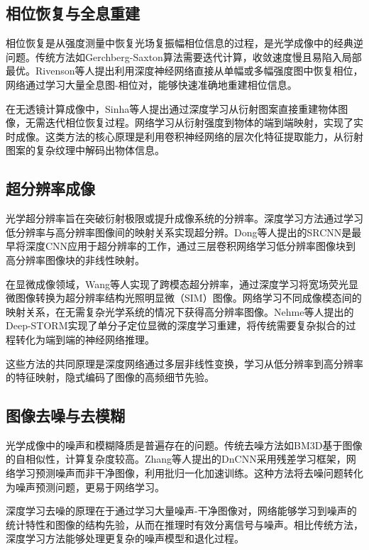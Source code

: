 {\subsection{相位恢复与全息重建}

相位恢复是从强度测量中恢复光场复振幅相位信息的过程，是光学成像中的经典逆问题。传统方法如Gerchberg-Saxton算法\citep{gerchberg1972practical}需要迭代计算，收敛速度慢且易陷入局部最优。Rivenson等人\citep{rivenson2018phase}提出利用深度神经网络直接从单幅或多幅强度图中恢复相位，网络通过学习大量全息图-相位对，能够快速准确地重建相位信息。

在无透镜计算成像中，Sinha等人\citep{sinha2017lensless}提出通过深度学习从衍射图案直接重建物体图像，无需迭代相位恢复过程。网络学习从衍射强度到物体的端到端映射，实现了实时成像。这类方法的核心原理是利用卷积神经网络的层次化特征提取能力，从衍射图案的复杂纹理中解码出物体信息。

\subsection{超分辨率成像}

光学超分辨率旨在突破衍射极限或提升成像系统的分辨率。深度学习方法通过学习低分辨率与高分辨率图像间的映射关系实现超分辨。Dong等人\citep{dong2015image}提出的SRCNN是最早将深度CNN应用于超分辨率的工作，通过三层卷积网络学习低分辨率图像块到高分辨率图像块的非线性映射。

在显微成像领域，Wang等人\citep{wang2019deep}实现了跨模态超分辨率，通过深度学习将宽场荧光显微图像转换为超分辨率结构光照明显微（SIM）图像。网络学习不同成像模态间的映射关系，在无需复杂光学系统的情况下获得高分辨率图像。Nehme等人\citep{nehme2018deep}提出的Deep-STORM实现了单分子定位显微的深度学习重建，将传统需要复杂拟合的过程转化为端到端的神经网络推理。

这些方法的共同原理是深度网络通过多层非线性变换，学习从低分辨率到高分辨率的特征映射，隐式编码了图像的高频细节先验。

\subsection{图像去噪与去模糊}

光学成像中的噪声和模糊降质是普遍存在的问题。传统去噪方法如BM3D基于图像的自相似性，计算复杂度较高。Zhang等人\citep{zhang2017beyond}提出的DnCNN采用残差学习框架，网络学习预测噪声而非干净图像，利用批归一化加速训练。这种方法将去噪问题转化为噪声预测问题，更易于网络学习。

深度学习去噪的原理在于通过学习大量噪声-干净图像对，网络能够学习到噪声的统计特性和图像的结构先验，从而在推理时有效分离信号与噪声。相比传统方法，深度学习方法能够处理更复杂的噪声模型和退化过程。

}
